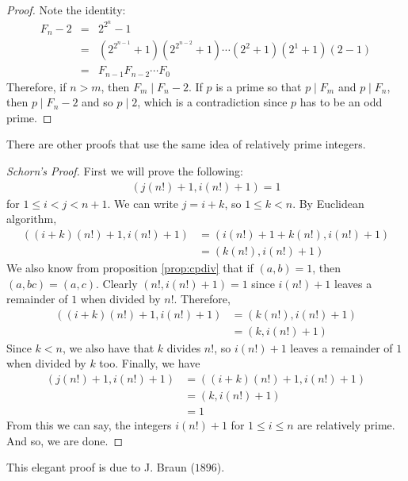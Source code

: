 \documentclass{subfiles}
\begin{document}
		\begin{proof}
			Note the identity:
			\begin{eqnarray*}
				F_n-2 & = & 2^{2^n}-1\\
					  & = & \left(2^{2^{n-1}}+1\right)\left(2^{2^{n-2}}+1\right)\cdots\left(2^2+1\right)(2^1+1)(2-1)\\
					  & = & F_{n-1}F_{n-2}\cdots F_{0}
			\end{eqnarray*}
			Therefore, if $n>m$, then $F_m\mid F_n-2$. If $p$ is a prime so that $p\mid F_m$ and $p\mid F_n$, then $p\mid F_n-2$ and so $p\mid 2$, which is a contradiction since $p$ has to be an odd prime.
		\end{proof}
	There are other proofs that use the same idea of relatively prime integers.
		\begin{proof}[Schorn's Proof]
			First we will prove the following:
				\begin{align*}
					(j(n!)+1,i(n!)+1)=1
				\end{align*}
			for $1\leq i<j<n+1$. We can write $j=i+k$, so $1\leq k<n$. By Euclidean algorithm,
				\begin{align*}
					((i+k)(n!)+1,i(n!)+1) & = (i(n!)+1+k(n!),i(n!)+1)\\
										  & = (k(n!),i(n!)+1)
				\end{align*}
			We also know from proposition \eqref{prop:cpdiv} that if $(a,b)=1$, then $(a,bc)=(a,c)$. Clearly $(n!,i(n!)+1)=1$ since $i(n!)+1$ leaves a remainder of $1$ when divided by $n!$. Therefore,
				\begin{align*}
					((i+k)(n!)+1,i(n!)+1) & = (k(n!),i(n!)+1)\\
										  & = (k,i(n!)+1)
				\end{align*}
			Since $k<n$, we also have that $k$ divides $n!$, so $i(n!)+1$ leaves a remainder of $1$ when divided by $k$ too. Finally, we have
				\begin{align*}
					(j(n!)+1,i(n!)+1)
						& = ((i+k)(n!)+1,i(n!)+1)\\
						& = (k,i(n!)+1)\\
						& = 1
				\end{align*}
			From this we can say, the integers $i(n!)+1$ for $1\leq i\leq n$ are relatively prime. And so, we are done.
		\end{proof}
	This elegant proof is due to J. Braun ($1896$).
\end{document}
